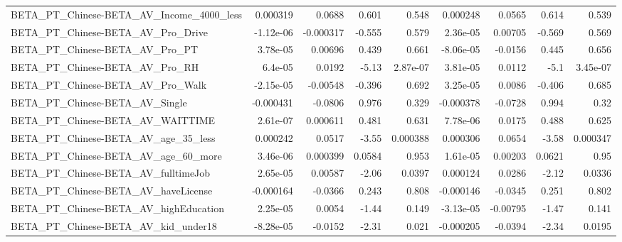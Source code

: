 \begin{tabular}{lrrrrrrrr}
BETA\_PT\_Chinese-BETA\_AV\_Income\_4000\_less           &    0.000319 &       0.0688 &     0.601 &    0.548 &   0.000248 &      0.0565 &        0.614 &         0.539 \\
BETA\_PT\_Chinese-BETA\_AV\_Pro\_Drive                  &   -1.12e-06 &    -0.000317 &    -0.555 &    0.579 &   2.36e-05 &     0.00705 &       -0.569 &         0.569 \\
BETA\_PT\_Chinese-BETA\_AV\_Pro\_PT                     &    3.78e-05 &      0.00696 &     0.439 &    0.661 &  -8.06e-05 &     -0.0156 &        0.445 &         0.656 \\
BETA\_PT\_Chinese-BETA\_AV\_Pro\_RH                     &     6.4e-05 &       0.0192 &     -5.13 & 2.87e-07 &   3.81e-05 &      0.0112 &         -5.1 &      3.45e-07 \\
BETA\_PT\_Chinese-BETA\_AV\_Pro\_Walk                   &   -2.15e-05 &     -0.00548 &    -0.396 &    0.692 &   3.25e-05 &      0.0086 &       -0.406 &         0.685 \\
BETA\_PT\_Chinese-BETA\_AV\_Single                     &   -0.000431 &      -0.0806 &     0.976 &    0.329 &  -0.000378 &     -0.0728 &        0.994 &          0.32 \\
BETA\_PT\_Chinese-BETA\_AV\_WAITTIME                   &    2.61e-07 &     0.000611 &     0.481 &    0.631 &   7.78e-06 &      0.0175 &        0.488 &         0.625 \\
BETA\_PT\_Chinese-BETA\_AV\_age\_35\_less                &    0.000242 &       0.0517 &     -3.55 & 0.000388 &   0.000306 &      0.0654 &        -3.58 &      0.000347 \\
BETA\_PT\_Chinese-BETA\_AV\_age\_60\_more                &    3.46e-06 &     0.000399 &    0.0584 &    0.953 &   1.61e-05 &     0.00203 &       0.0621 &          0.95 \\
BETA\_PT\_Chinese-BETA\_AV\_fulltimeJob                &    2.65e-05 &      0.00587 &     -2.06 &   0.0397 &   0.000124 &      0.0286 &        -2.12 &        0.0336 \\
BETA\_PT\_Chinese-BETA\_AV\_haveLicense                &   -0.000164 &      -0.0366 &     0.243 &    0.808 &  -0.000146 &     -0.0345 &        0.251 &         0.802 \\
BETA\_PT\_Chinese-BETA\_AV\_highEducation              &    2.25e-05 &       0.0054 &     -1.44 &    0.149 &  -3.13e-05 &    -0.00795 &        -1.47 &         0.141 \\
BETA\_PT\_Chinese-BETA\_AV\_kid\_under18                &   -8.28e-05 &      -0.0152 &     -2.31 &    0.021 &  -0.000205 &     -0.0394 &        -2.34 &        0.0195 \\

\end{tabular}

